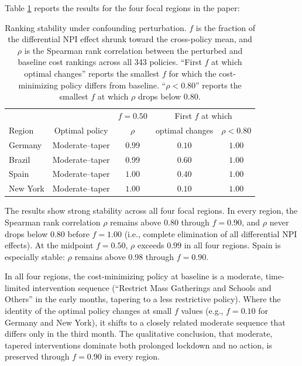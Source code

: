 \documentclass[letterpaper,twoside,11pt]{reviewresponse}
\begin{document}
Table \ref{tab:ranking_stability_r1} reports the results for the four focal regions in the paper:
\begin{table}[h!]
	\centering
	\begin{tabular}{|l|c|c|cc|}
		\hline
		& & $f=0.50$ & \multicolumn{2}{c|}{First $f$ at which} \\
		Region & Optimal policy & $\rho$ & optimal changes & $\rho < 0.80$ \\\hline
		Germany & Moderate--taper & $0.99$ & $0.10$ & $1.00$ \\
		Brazil  & Moderate--taper & $0.99$ & $0.60$ & $1.00$ \\
		Spain   & Moderate--taper & $1.00$ & $0.40$ & $1.00$ \\
		New York & Moderate--taper & $1.00$ & $0.10$ & $1.00$ \\\hline
	\end{tabular}
	\caption{Ranking stability under confounding perturbation. $f$ is the fraction of the differential NPI effect shrunk toward the cross-policy mean, and $\rho$ is the Spearman rank correlation between the perturbed and baseline cost rankings across all 343 policies. ``First $f$ at which optimal changes'' reports the smallest $f$ for which the cost-minimizing policy differs from baseline. ``$\rho < 0.80$'' reports the smallest $f$ at which $\rho$ drops below $0.80$.}
	\label{tab:ranking_stability_r1}
\end{table}

The results show strong stability across all four focal regions. In every region, the Spearman rank correlation $\rho$ remains above $0.80$ through $f = 0.90$, and $\rho$ never drops below $0.80$ before $f = 1.00$ (i.e., complete elimination of all differential NPI effects). At the midpoint $f = 0.50$, $\rho$ exceeds $0.99$ in all four regions. Spain is especially stable: $\rho$ remains above $0.98$ through $f = 0.90$.

In all four regions, the cost-minimizing policy at baseline is a moderate, time-limited intervention sequence (``Restrict Mass Gatherings and Schools and Others'' in the early months, tapering to a less restrictive policy). Where the identity of the optimal policy changes at small $f$ values (e.g., $f = 0.10$ for Germany and New York), it shifts to a closely related moderate sequence that differs only in the third month. The qualitative conclusion, that moderate, tapered interventions dominate both prolonged lockdown and no action, is preserved through $f = 0.90$ in every region.
\end{document}
